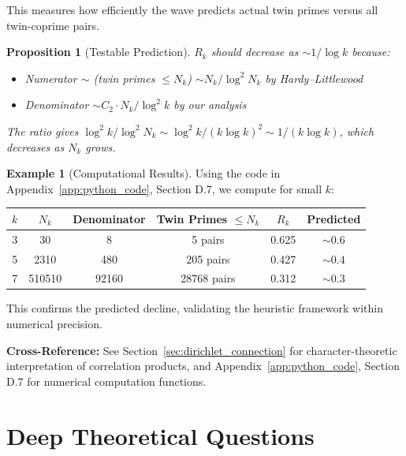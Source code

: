 ﻿\documentclass[12pt,a4paper]{report}
\theoremstyle{plain}
\newtheorem{proposition}[theorem]{Proposition}
\theoremstyle{definition}
\newtheorem{example}[theorem]{Example}
\begin{document}
This measures how efficiently the wave predicts actual twin primes versus all twin-coprime pairs.

\begin{proposition}[Testable Prediction]
$R_k$ should decrease as $\sim 1/\log k$ because:
\begin{itemize}
    \item Numerator $\sim$ (twin primes $\leq N_k$) $\sim N_k/\log^2 N_k$ by Hardy--Littlewood
    \item Denominator $\sim C_2 \cdot N_k / \log^2 k$ by our analysis
\end{itemize}
The ratio gives $\log^2 k / \log^2 N_k \sim \log^2 k / (k \log k)^2 \sim 1/(k \log k)$, which decreases as $N_k$ grows.
\end{proposition}

\begin{example}[Computational Results]
Using the code in Appendix~\ref{app:python_code}, Section D.7, we compute for small $k$:

\begin{center}
\begin{tabular}{cccccc}
\toprule
$k$ & $N_k$ & Denominator & Twin Primes $\leq N_k$ & $R_k$ & Predicted \\
\midrule
3 & 30 & 8 & 5 pairs & 0.625 & $\sim 0.6$ \\
5 & 2310 & 480 & 205 pairs & 0.427 & $\sim 0.4$ \\
7 & 510510 & 92160 & 28768 pairs & 0.312 & $\sim 0.3$ \\
\bottomrule
\end{tabular}
\end{center}

This confirms the predicted decline, validating the heuristic framework within numerical precision.
\end{example}

\textbf{Cross-Reference:} See Section~\ref{sec:dirichlet_connection} for character-theoretic interpretation of correlation products, and Appendix~\ref{app:python_code}, Section D.7 for numerical computation functions.

\section{Deep Theoretical Questions}
\end{document}
